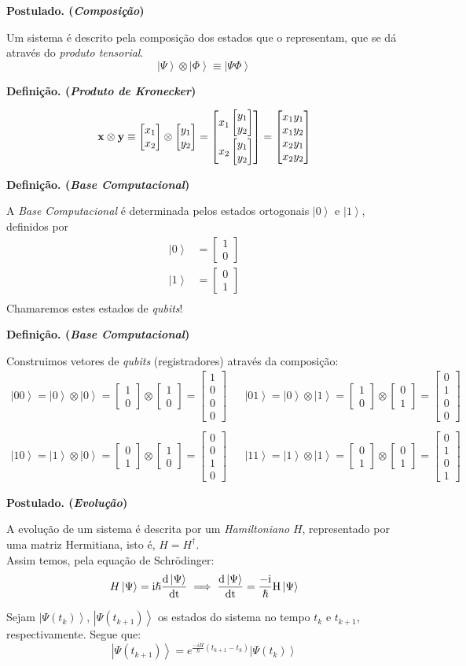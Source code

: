 \documentclass[t]{beamer}
\newcommand{\ii}{
	\rm{i}
}
\newcommand{\postulado}[1]{%
	\textbf{Postulado. (\emph{#1})\\}
}
\newcommand{\definicao}[1]{%
	\textbf{Definição. (\emph{#1})\\}
}
\newcommand{\vetor}[2]{\ensuremath{
\left[\begin{matrix}
#1 \\
#2
\end{matrix}\right]
}
}
\newcommand{\vetorx}[4]{\ensuremath{
\left[\begin{matrix}
#1 \\
#2 \\
#3 \\
#4
\end{matrix}\right]
}
}
\newcommand{\ket}[1]{\ensuremath{\left|#1\right\rangle}}
\begin{document}
	\begin{frame}{\subsecname}
		\postulado{Composição}
		Um sistema é descrito pela composição dos estados que o representam, que se dá através do \emph{produto tensorial}.
		$$\ket{\Psi} \otimes \ket{\Phi} \equiv \ket{\Psi\Phi}$$
		
		\definicao{Produto de Kronecker}
		
		\begin{align*}
		\mathbf{x} \otimes \mathbf{y} \equiv \vetor{x_1}{x_2} \otimes \vetor{y_1}{y_2} = \vetor{x_1 \vetor{y_1}{y_2} \vspace{2pt}}{x_2 \vetor{y_1}{y_2}} = \vetorx{x_1 y_1}{x_1 y_2}{x_2 y_1 }{x_2 y_2}
		\end{align*}
	\end{frame}
	
	\begin{frame}{\subsecname}
		\definicao{Base Computacional}
		A \emph{Base Computacional} é determinada pelos estados ortogonais $\ket{0}$ e $\ket{1}$, definidos por
		\begin{align*}
		\ket{0} &= \vetor{1}{0}\\
		\ket{1} &= \vetor{0}{1}\\
		\end{align*}
		Chamaremos estes estados de \textit{qubits}!
	\end{frame}
	
	
	
	\begin{frame}{\subsecname}
		\definicao{Base Computacional}
		Construimos vetores de \textit{qubits} (registradores) através da composição:
		\footnotesize
		\begin{align*}
		\ket{00} = \ket{0} \otimes \ket{0} = \vetor{1}{0} \otimes \vetor{1}{0} = \vetorx{1}{0}{0}{0} &&
		\ket{01} = \ket{0} \otimes \ket{1} = \vetor{1}{0} \otimes \vetor{0}{1} = \vetorx{0}{1}{0}{0} \\
		~\\
		\ket{10} = \ket{1} \otimes \ket{0} = \vetor{0}{1} \otimes \vetor{1}{0} = \vetorx{0}{0}{1}{0} &&
		\ket{11} = \ket{1} \otimes \ket{1} = \vetor{0}{1} \otimes \vetor{0}{1} = \vetorx{0}{1}{0}{1}
		\end{align*}
		\normalsize
	\end{frame}
	
	\begin{frame}{\subsecname}
		\postulado{Evolução}
		A evolução de um sistema é descrita por um \textit{Hamiltoniano} $H$, representado por uma matriz Hermitiana, isto é, $H = H^{\dagger}$.\\
		
		Assim temos, pela equação de Schrödinger:
		$$H \ket{\Psi} =\ii \hslash \frac{d \ket{\Psi}}{dt} \implies \frac{d \ket{\Psi}}{dt} = \frac{-\ii}{\hslash} H \ket{\Psi}$$
		
		Sejam $\ket{\Psi(t_k)}$, $\ket{\Psi(t_{k+1})}$ os estados do sistema no tempo $t_k$ e $t_{k+1}$, respectivamente. Segue que:
		$$\ket{\Psi(t_{k+1})} = e^{\frac{-i H}{\hslash} (t_{k+1} - t_k)} \ket{\Psi(t_k)}$$
	\end{frame}
	
\end{document}
